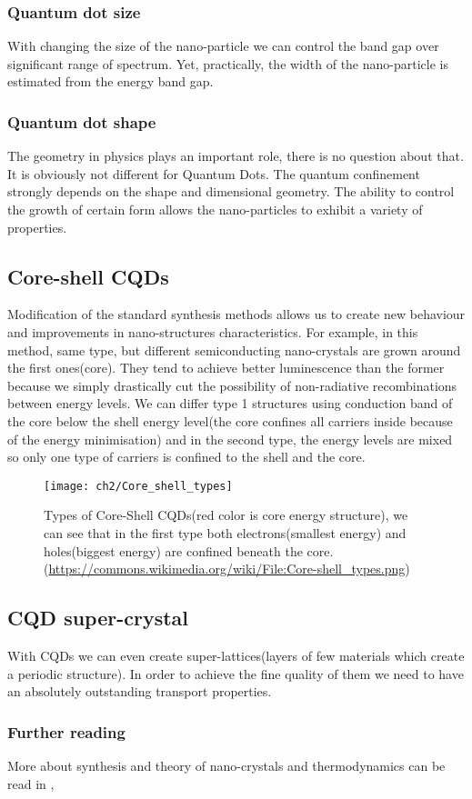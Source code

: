 \subsubsection{Quantum dot size}
With changing the size of the nano-particle we can control the band gap over significant range of spectrum. Yet, practically, the width of the nano-particle is estimated from the energy band gap.
 \cite{Yu2003}
 
\subsubsection{Quantum dot shape}
The geometry in physics plays an important role, there is no question about that. It is obviously not different for Quantum Dots. The quantum confinement strongly depends on the shape and dimensional geometry. The ability to control the growth of certain form allows the nano-particles to exhibit a variety of properties. 

\subsection{Core-shell CQDs}     
Modification of the standard synthesis methods allows us to create new behaviour and improvements in nano-structures characteristics. For example, in this method, same type, but different semiconducting nano-crystals are grown around the first ones(core). They tend to achieve better luminescence than the former because we simply drastically cut the possibility of non-radiative recombinations between energy levels. We can differ type 1 structures using conduction band of the core below the shell energy level(the core confines all carriers inside because of the energy minimisation) and in the second type, the energy levels are mixed so only one type of carriers is confined to the shell and the core. \cite{phdsemi}

\begin{figure}[h]
\centering
\texttt{[image: ch2/Core\_shell\_types]}
\caption{Types of Core-Shell CQDs(red color is core energy structure), we can see that in the first type both electrons(smallest energy) and holes(biggest energy) are confined beneath the core. (\url{https://commons.wikimedia.org/wiki/File:Core-shell_types.png})}
\end{figure}

\subsection{CQD super-crystal}
With CQDs we can even create super-lattices(layers of few materials which create a periodic structure). In order to achieve the fine quality of them we need to have an absolutely outstanding transport properties. \cite{tranSupLat}
\subsubsection{Further reading}
More about synthesis and theory of nano-crystals and thermodynamics can be read in \cite{Klimov}, \cite{crystal}